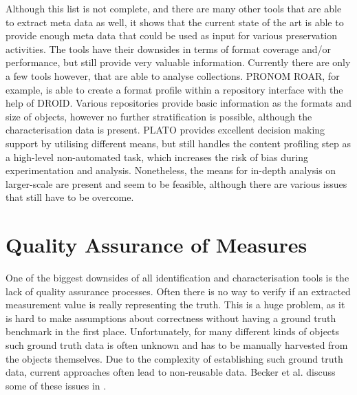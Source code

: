 Although this list is not complete, and there are many other tools that are able to extract meta data as well, it shows that the current state of the art is able to provide enough meta data that could be used as input for various preservation activities. The tools have their downsides in terms of format coverage and/or performance, but still provide very valuable information.
Currently there are only a few tools however, that are able to analyse collections. PRONOM ROAR, for example, is able to create a format profile within a repository interface with the help of DROID.
Various repositories provide basic information as the formats and size of objects, however no further stratification is possible, although the characterisation data is present.
PLATO provides excellent decision making support by utilising different means, but still handles the content profiling step as a high-level non-automated task, which increases the risk of bias during experimentation and analysis.
Nonetheless, the means for in-depth analysis on larger-scale are present and seem to be feasible, although there are various issues that still have to be overcome.

\section{Quality Assurance of Measures}
One of the biggest downsides of all identification and characterisation tools is the lack of quality assurance processes. Often there is no way to verify if an extracted measurement value is really representing the truth. This is a huge problem, as it is hard to make assumptions about correctness without having a ground truth benchmark in the first place. Unfortunately, for many different kinds of objects such ground truth data is often unknown and has to be manually harvested from the objects themselves. Due to the complexity of establishing such ground truth data, current approaches often lead to non-reusable data. Becker et al. discuss some of these issues in \cite{becker:decision}.

